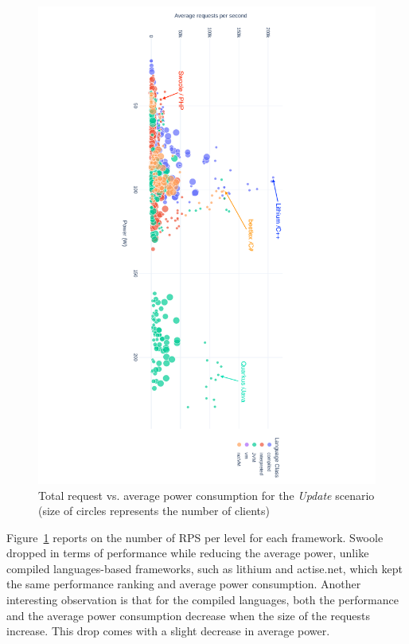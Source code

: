 \begin{figure}[!h]
    \includegraphics[height=\textwidth,width=\textheight,keepaspectratio,angle=90]{imgs/power_requests_update}
    \caption{Total request vs. average power consumption for the \emph{Update} scenario (size of circles represents the number of clients)}
    \label{fig:power_requests_update}
\end{figure}
Figure~\ref{fig:power_requests_update} reports on the number of RPS per level for each framework.
Swoole dropped in terms of performance while reducing the average power, unlike compiled languages-based frameworks, such as lithium and actise.net, which kept the same performance ranking and average power consumption.
Another interesting observation is that for the compiled languages, both the performance and the average power consumption decrease when the size of the requests increase.
This drop comes with a slight decrease in average power.

